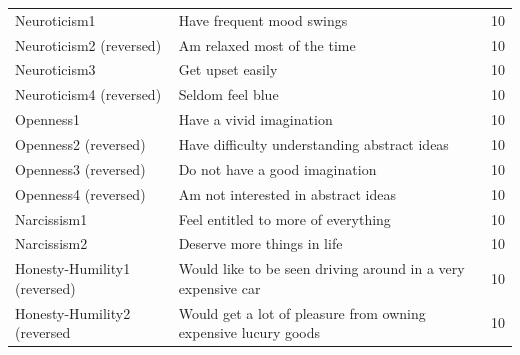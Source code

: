 \documentclass[
  man,floatsintext]{apa6}
\newenvironment{lltable}{\begin{landscape}\centering\begin{ThreePartTable}}{\end{ThreePartTable}\end{landscape}}
\begin{document}
\begin{lltable}
{\begin{longtable}{p{5cm}p{14cm}p{1cm}}
Neuroticism1 & Have frequent mood swings & 10\\
Neuroticism2 (reversed) & Am relaxed most of the time & 10\\
Neuroticism3 & Get upset easily & 10\\
Neuroticism4 (reversed) & Seldom feel blue & 10\\
Openness1 & Have a vivid imagination & 10\\
Openness2 (reversed) & Have difficulty understanding abstract ideas & 10\\
Openness3 (reversed) & Do not have a good imagination & 10\\
Openness4 (reversed) & Am not interested in abstract ideas & 10\\
Narcissism1 & Feel entitled to more of everything & 10\\
Narcissism2 & Deserve more things in life & 10\\
Honesty-Humility1 (reversed) & Would like to be seen driving around in a very expensive car & 10\\
Honesty-Humility2 (reversed & Would get a lot of pleasure from owning expensive lucury goods & 10\\
\bottomrule
\end{longtable}

}

\end{lltable}

\newpage
\end{document}
